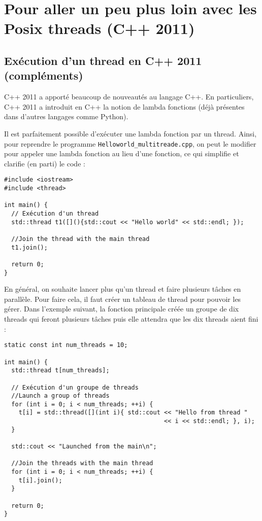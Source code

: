 \documentclass[fleqn,11pt]{article}
\begin{document}
\section{Pour aller un peu plus loin avec les Posix threads (C++ 2011)}

\subsection{Exécution d'un thread en C++ 2011 (compléments)}

C++ 2011 a apporté beaucoup de nouveautés au langage C++. En particuliers, C++ 2011 a introduit
en C++ la notion de lambda fonctions (déjà présentes dans d'autres langages comme Python).

Il est parfaitement possible d'exécuter une lambda fonction par un thread. Ainsi,
pour reprendre le programme \texttt{Helloworld\_multitreade.cpp}, on peut le modifier
pour appeler une lambda fonction au lieu d'une fonction, ce qui simplifie et clarifie
(en parti) le code :

\begin{lstlisting}
#include <iostream>
#include <thread>

int main() {
  // Exécution d'un thread
  std::thread t1([](){std::cout << "Hello world" << std::endl; });

  //Join the thread with the main thread
  t1.join();

  return 0;
}
\end{lstlisting}

En général, on souhaite lancer plus qu'un thread et faire plusieurs tâches en parallèle. Pour faire cela,
il faut créer un tableau de thread pour pouvoir les gérer. 
Dans l'exemple suivant, la fonction principale créée un groupe de dix threads  qui feront plusieurs tâches puis elle attendra que les dix threads aient fini :

\begin{lstlisting}
static const int num_threads = 10;

int main() {
  std::thread t[num_threads];

  // Exécution d'un groupe de threads
  //Launch a group of threads
  for (int i = 0; i < num_threads; ++i) {
    t[i] = std::thread([](int i){ std::cout << "Hello from thread " 
                                            << i << std::endl; }, i);
  }

  std::cout << "Launched from the main\n";

  //Join the threads with the main thread
  for (int i = 0; i < num_threads; ++i) {
    t[i].join();
  }

  return 0;
}
\end{lstlisting}
\end{document}
